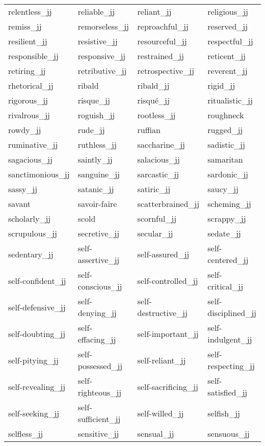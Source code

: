 \begin{longtable}[!htbp]{| llll |}
   relentless\_jj & reliable\_jj & reliant\_jj & religious\_jj \\
   remiss\_jj & remorseless\_jj & reproachful\_jj & reserved\_jj \\
   resilient\_jj & resistive\_jj & resourceful\_jj & respectful\_jj \\
   responsible\_jj & responsive\_jj & restrained\_jj & reticent\_jj \\
   retiring\_jj & retributive\_jj & retrospective\_jj & reverent\_jj \\
   rhetorical\_jj & ribald & ribald\_jj & rigid\_jj \\
   rigorous\_jj & risque\_jj & risqué\_jj & ritualistic\_jj \\
   rivalrous\_jj & roguish\_jj & rootless\_jj & roughneck \\
   rowdy\_jj & rude\_jj & ruffian & rugged\_jj \\
   ruminative\_jj & ruthless\_jj & saccharine\_jj & sadistic\_jj \\
   sagacious\_jj & saintly\_jj & salacious\_jj & samaritan \\
   sanctimonious\_jj & sanguine\_jj & sarcastic\_jj & sardonic\_jj \\
   sassy\_jj & satanic\_jj & satiric\_jj & saucy\_jj \\
   savant & savoir-faire & scatterbrained\_jj & scheming\_jj \\
   scholarly\_jj & scold & scornful\_jj & scrappy\_jj \\
   scrupulous\_jj & secretive\_jj & secular\_jj & sedate\_jj \\
   sedentary\_jj & self-assertive\_jj & self-assured\_jj & self-centered\_jj \\
   self-confident\_jj & self-conscious\_jj & self-controlled\_jj & self-critical\_jj \\
   self-defensive\_jj & self-denying\_jj & self-destructive\_jj & self-disciplined\_jj \\
   self-doubting\_jj & self-effacing\_jj & self-important\_jj & self-indulgent\_jj \\
   self-pitying\_jj & self-possessed\_jj & self-reliant\_jj & self-respecting\_jj \\
   self-revealing\_jj & self-righteous\_jj & self-sacrificing\_jj & self-satisfied\_jj \\
   self-seeking\_jj & self-sufficient\_jj & self-willed\_jj & selfish\_jj \\
   selfless\_jj & sensitive\_jj & sensual\_jj & sensuous\_jj \\

\end{longtable}
